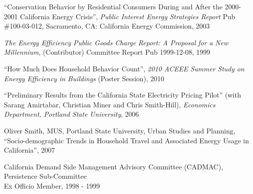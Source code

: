\documentclass[Computer Science]{vita}
\begin{document}
\begin{vita}
\begin{Selected Publications}
\begin{Unrefereed Public Reports}
    \item ``Conservation Behavior by Residential Consumers During and
      After the 2000-2001 California Energy Crisis'', \emph{Public
        Interest Energy Strategies Report} Pub \#100-03-012,
      Sacramento, CA: California Energy Commission, 2003

    \item \emph{The Energy Efficiency Public Goods Charge Report: A
        Proposal for a New Millennium}, (Contributor) Committee Report
      Pub 1999-12-08, 1999
	\end{Unrefereed Public Reports}
  
  
  \end{Selected Publications}

  \begin{Selected Presentations and Invited Talks}

  \item ``How Much Does Household Behavior Count'', \emph{2010 ACEEE
      Summer Study on Energy Efficiency in Buildings} (Poster
    Session), 2010

  \item ``Preliminary Results from the California State Electricity
    Pricing Pilot'' (with Sarang Amirtabar, Christian Miner and Chris
    Smith-Hill), \emph{Economics Department, Portland State
      University}, 2006

  \end{Selected Presentations and Invited Talks}



  \begin{Instructional Activities}



    \begin{M.S. Thesis Adviser}
    \item Oliver Smith, MUS, Portland State University,
      Urban Studies and Planning, ``Socio-demographic Trends in
      Household Travel and Associated Energy Usage in California'',
      2007

    \end{M.S. Thesis Adviser}

      
  \end{Instructional Activities}
  \begin{Selected Professional and Service Activities}


    \begin{Community}

	
    \item California Demand Side Management Advisory Committee (CADMAC), Persistence Sub-Committee\\
      Ex Officio Member, 1998 - 1999


\end{Community}
\end{Selected Professional and Service Activities}
\end{vita}
\end{document}
